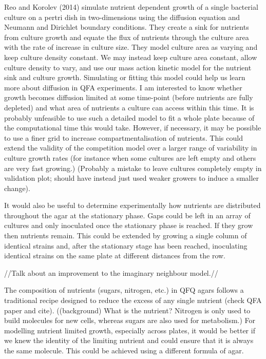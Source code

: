Reo and Korolev (2014) simulate nutrient dependent growth of a single
bacterial culture on a pertri dish in two-dimensions using the
diffusion equation and Neumann and Dirichlet boundary conditions. They
create a sink for nutrients from culture growth and equate the flux of
nutrients through the culture area with the rate of increase in
culture size. They model culture area as varying and keep culture
density constant. We may instead keep culture area constant, allow
culture density to vary, and use our mass action kinetic model for the
nutrient sink and culture growth. Simulating or fitting this model
could help us learn more about diffusion in QFA experiments. I am
interested to know whether growth becomes diffusion limited at some
time-point (before nutrients are fully depleted) and what area of
nutrients a culture can access within this time. It is probably
unfeasible to use such a detailed model to fit a whole plate because
of the computational time this would take. However, if necessary, it
may be possible to use a finer grid to increase compartmentalisation
of nutrients. This could extend the validity of the competition model
over a larger range of variability in culture growth rates (for
instance when some cultures are left empty and others are very fast
growing.) (Probably a mistake to leave cultures completely empty in
validation plot; should have instead just used weaker growers to
induce a smaller change).

It would also be useful to determine experimentally how nutrients are
distributed throughout the agar at the stationary phase. Gaps could be
left in an array of cultures and only inoculated once the stationary
phase is reached. If they grow then nutrients remain. This could be
extended by growing a single column of identical strains and, after
the stationary stage has been reached, inoculating identical strains
on the same plate at different distances from the row.

//Talk about an improvement to the imaginary neighbour model.//

The composition of nutrients (sugars, nitrogen, etc.) in QFQ agars
follows a traditional recipe designed to reduce the excess of any
single nutrient (check QFA paper and cite). ((background) What is the
nutrient?  Nitrogen is only used to build molecules for new cells,
whereas sugars are also used for metabolism.) For modelling nutrient
limited growth, especially across plates, it would be better if we
knew the identity of the limiting nutrient and could ensure that it is
always the same molecule. This could be achieved using a different
formula of agar.

